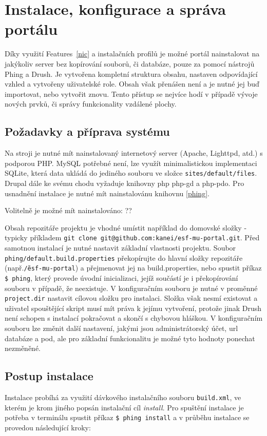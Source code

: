 \chapter{Instalace, konfigurace a správa portálu}
\label{chap:instalace}

Díky využití Features~\ref{nic} a instalačních profilů je možné portál nainstalovat na jakýkoliv server bez kopírování souborů, či databáze, pouze za pomocí nástrojů Phing a Drush. Je vytvořena kompletní struktura obsahu, nastaven odpovídající vzhled a vytvořeny uživatelské role. Obsah však přenášen není a je nutné jej buď importovat, nebo vytvořit znovu. Tento přístup se nejvíce hodí v případě vývoje nových prvků, či správy funkcionality vzdálené plochy.

\section{Požadavky a příprava systému}

Na stroji je nutné mít nainstalovaný internetový server (Apache, Lighttpd, atd.) s podporou PHP. MySQL potřebné není, lze využít minimalistickou implementaci SQLite, která data ukládá do jediného souboru ve složce \texttt{sites/default/files}. Drupal dále ke svému chodu vyžaduje knihovny php php-gd a php-pdo. Pro usnadnění instalace je nutné mít nainstalovánu knihovnu \ref{phing}.

Volitelně je možné mít nainstalováno: ??

Obsah repozitáře projektu je vhodné umístit například do domovské složky - typicky příkladem \texttt{git clone git@github.com:kanei/esf-mu-portal.git}. Před samotnou instalací je nutné nastavit základní vlastnosti projektu. Soubor \texttt{phing/default.build.properties} překopírujte do hlavní složky repozitáře (např.\texttt{\~/esf-mu-portal}) a přejmenovat jej na build.properties, nebo spustit příkaz \texttt{\$~phing}, který provede úvodní inicializaci, jejíž součástí je i překopírování souboru v případě, že neexistuje. V konfiguračním souboru je nutné v proměnné \texttt{project.dir} nastavit cílovou složku pro instalaci. Složka však nesmí existovat a uživatel spouštějící skript musí mít práva k jejímu vytvoření, protože jinak Drush není schopen s instalací pokračovat a skončí s chybovou hláškou. V konfiguračním souboru lze změnit další nastavení, jakými jsou administrátorský účet, url databáze a pod, ale pro základní funkcionalitu je možné tyto hodnoty ponechat nezměněné.

\section{Postup instalace}
Instalace probíhá za využití dávkového instalačního souboru \texttt{build.xml}, ve kterém je krom jiného popsán instalační cíl \emph{install}. Pro spuštění instalace je potřeba v terminálu spustit příkaz \texttt{\$~phing install} a v  průběhu instalace se provedou následující kroky:

